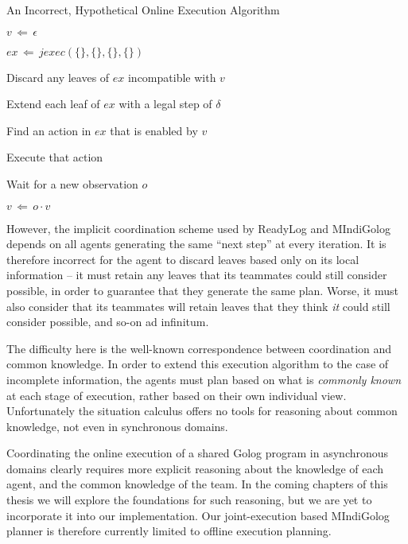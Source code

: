 %
\begin{algorithm}[t]
\caption{An Incorrect, Hypothetical Online Execution Algorithm}


\label{alg:je_online_exec_invalid} \begin{algorithmic}

\STATE

\STATE $v\,\Leftarrow\,\epsilon$

\STATE $ex\,\Leftarrow\, jexec(\{\},\{\},\{\},\{\})$


\STATE Discard any leaves of $ex$ incompatible with $v$

\STATE Extend each leaf of $ex$ with a legal step of $\delta$

\STATE Find an action in $ex$ that is enabled by $v$


\STATE Execute that action

\ENDIF

\STATE Wait for a new observation $o$

\STATE $v\,\Leftarrow\, o\cdot v$

\ENDWHILE

\end{algorithmic} 
\end{algorithm}


However, the implicit coordination scheme used by ReadyLog and MIndiGolog
depends on all agents generating the same {}``next step'' at every
iteration. It is therefore incorrect for the agent to discard leaves
based only on its local information -- it must retain any leaves that
its teammates could still consider possible, in order to guarantee
that they generate the same plan. Worse, it must also consider that
its teammates will retain leaves that they think \emph{it }could still
consider possible, and so-on ad infinitum.

The difficulty here is the well-known correspondence between coordination
and common knowledge. In order to extend this execution algorithm
to the case of incomplete information, the agents must plan based
on what is \emph{commonly known} at each stage of execution, rather
based on their own individual view. Unfortunately the situation calculus
offers no tools for reasoning about common knowledge, not even in
synchronous domains.

Coordinating the online execution of a shared Golog program in asynchronous
domains clearly requires more explicit reasoning about the knowledge
of each agent, and the common knowledge of the team. In the coming
chapters of this thesis we will explore the foundations for such reasoning,
but we are yet to incorporate it into our implementation. Our joint-execution
based MIndiGolog planner is therefore currently limited to offline
execution planning.


